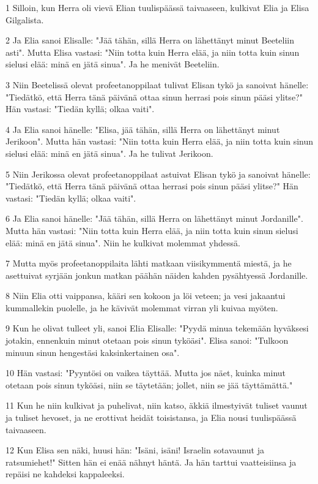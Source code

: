 \par 1 Silloin, kun Herra oli vievä Elian tuulispäässä taivaaseen, kulkivat Elia ja Elisa Gilgalista.
\par 2 Ja Elia sanoi Elisalle: "Jää tähän, sillä Herra on lähettänyt minut Beeteliin asti". Mutta Elisa vastasi: "Niin totta kuin Herra elää, ja niin totta kuin sinun sielusi elää: minä en jätä sinua". Ja he menivät Beeteliin.
\par 3 Niin Beetelissä olevat profeetanoppilaat tulivat Elisan tykö ja sanoivat hänelle: "Tiedätkö, että Herra tänä päivänä ottaa sinun herrasi pois sinun pääsi ylitse?" Hän vastasi: "Tiedän kyllä; olkaa vaiti".
\par 4 Ja Elia sanoi hänelle: "Elisa, jää tähän, sillä Herra on lähettänyt minut Jerikoon". Mutta hän vastasi: "Niin totta kuin Herra elää, ja niin totta kuin sinun sielusi elää: minä en jätä sinua". Ja he tulivat Jerikoon.
\par 5 Niin Jerikossa olevat profeetanoppilaat astuivat Elisan tykö ja sanoivat hänelle: "Tiedätkö, että Herra tänä päivänä ottaa herrasi pois sinun pääsi ylitse?" Hän vastasi: "Tiedän kyllä; olkaa vaiti".
\par 6 Ja Elia sanoi hänelle: "Jää tähän, sillä Herra on lähettänyt minut Jordanille". Mutta hän vastasi: "Niin totta kuin Herra elää, ja niin totta kuin sinun sielusi elää: minä en jätä sinua". Niin he kulkivat molemmat yhdessä.
\par 7 Mutta myös profeetanoppilaita lähti matkaan viisikymmentä miestä, ja he asettuivat syrjään jonkun matkan päähän näiden kahden pysähtyessä Jordanille.
\par 8 Niin Elia otti vaippansa, kääri sen kokoon ja löi veteen; ja vesi jakaantui kummallekin puolelle, ja he kävivät molemmat virran yli kuivaa myöten.
\par 9 Kun he olivat tulleet yli, sanoi Elia Elisalle: "Pyydä minua tekemään hyväksesi jotakin, ennenkuin minut otetaan pois sinun tyköäsi". Elisa sanoi: "Tulkoon minuun sinun hengestäsi kaksinkertainen osa".
\par 10 Hän vastasi: "Pyyntösi on vaikea täyttää. Mutta jos näet, kuinka minut otetaan pois sinun tyköäsi, niin se täytetään; jollet, niin se jää täyttämättä."
\par 11 Kun he niin kulkivat ja puhelivat, niin katso, äkkiä ilmestyivät tuliset vaunut ja tuliset hevoset, ja ne erottivat heidät toisistansa, ja Elia nousi tuulispäässä taivaaseen.
\par 12 Kun Elisa sen näki, huusi hän: "Isäni, isäni! Israelin sotavaunut ja ratsumiehet!" Sitten hän ei enää nähnyt häntä. Ja hän tarttui vaatteisiinsa ja repäisi ne kahdeksi kappaleeksi.
